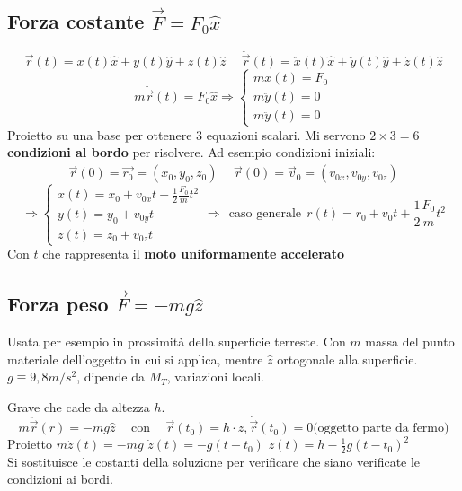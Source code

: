 \subsection{Forza costante $\vec{F} = F_0\hat{x}$}
$$\vec{r}(t) = x(t)\hat{x} + y(t)\hat{y} + z(t)\hat{z} \hspace{15pt}\ddot{\vec{r}}(t) = \ddot{x}(t)\hat{x} + \ddot{y}(t)\hat{y} + \ddot{z}(t)\hat{z}$$
$$m\ddot{\vec{r}}(t) = F_0 \hat{x} \Rightarrow 
\begin{cases}
    m\ddot{x}(t) = F_0\\
    m\ddot{y}(t) = 0\\
    m\ddot{y}(t) = 0 
\end{cases}
$$
Proietto su una base per ottenere 3 equazioni scalari. Mi servono $2 \times 3 = 6$ \textbf{condizioni al bordo} per risolvere.
Ad esempio condizioni iniziali:
$$\vec{r}(0) = \vec{r_0} = (x_0, y_0, z_0) \hspace{15pt} \dot{\vec{r}}(0) = \vec{v}_0 = (v_{0x}, v_{0y}, v_{0z})$$
$$\Rightarrow 
\begin{cases}
    x(t) = x_0 + v_{0x}t + \frac{1}{2}\frac{F_0}{m}t^2\\
    y(t) = y_0 + v_{0y}t \\
    z(t) = z_0 + v_{0z}t
\end{cases}
\Rightarrow \:\:\text{caso generale}\:\:
r(t) = r_0 + v_0t + \frac{1}{2}\frac{F_0}{m}t^2
$$
Con $t$ che rappresenta il \textbf{moto uniformamente accelerato}

\subsection{Forza peso $\vec{F} = -mg\hat{z}$}
Usata per esempio in prossimità della superficie terreste. Con $m$ massa del punto materiale dell'oggetto in cui si applica, mentre $\hat{z}$ ortogonale alla superficie. 
$g \equiv 9,8 m/s^2$, dipende da $M_T$, variazioni locali.
\begin{example}
    Grave che cade da altezza $h$.
    $$m\ddot{\vec{r}}(r) = -mg\hat{z} \hspace{15pt} \text{con}\hspace{15pt} \vec{r}(t_0) = h \cdot \hat{z}, \dot{\vec{r}}(t_0) = 0 \text{(oggetto parte da fermo)}$$
    Proietto $m\ddot{z}(t)= -mg$ \hspace{10pt} $\dot{z}(t) = -g(t - t_0)$ \hspace{10pt} $z(t) = h - \frac{1}{2}g(t - t_0)^2$\\
    Si sostituisce le costanti della soluzione per verificare che siano verificate le condizioni ai bordi.
\end{example}

